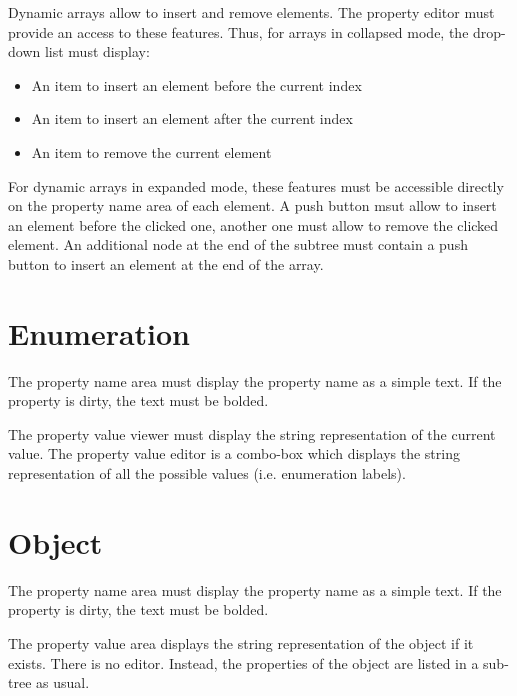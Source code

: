 \documentclass[a4paper, twoside]{report}
\begin{document}
Dynamic arrays allow to insert and remove elements. The property editor must provide an access to
these features. Thus, for arrays in collapsed mode, the drop-down list must display:
\begin{itemize}
    \item An item to insert an element before the current index
    \item An item to insert an element after the current index
    \item An item to remove the current element
\end{itemize}

For dynamic arrays in expanded mode, these features must be accessible directly on the property name
area of each element. A push button msut allow to insert an element before the clicked one, another
one must allow to remove the clicked element. An additional node at the end of the subtree must contain a push button to insert an element at the end of the array.

\section{Enumeration}

The property name area must display the property name as a simple text. If the property is dirty,
the text must be bolded.

The property value viewer must display the string representation of the current value.
The property value editor is a combo-box which displays the string representation of all the
possible values (i.e. enumeration labels).

\section{Object}

The property name area must display the property name as a simple text. If the property is dirty,
the text must be bolded.

The property value area displays the string representation of the object if it exists.
There is no editor. Instead, the properties of the object are listed in a sub-tree as usual.
\end{document}

